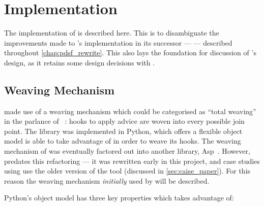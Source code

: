 \section{\pydysofu Implementation}\label{sec:prior_work_pdsf}

The implementation of \pydysofu{} is described here. This is to disambiguate the
improvements made to \pydysofu{}'s implementation in its successor ---
\pdsfthree --- described throughout \cref{chap:pdsf_rewrite}. This also lays the
foundation for discussion of \pdsfthree{}'s design, as it retains some design
decisions with \pydysofu.



\subsection{Weaving Mechanism}
\label{subsec:prior_work_weaving}

\pydysofu made use of a weaving mechanism which could be categorised as ``total
weaving'' in the parlance of
\citeauthor{dynamicAOchitchyan}~\cite{dynamicAOchitchyan}: hooks to apply advice
are woven into every possible join point. The library was implemented in Python,
which offers a flexible object model \pydysofu is able to take advantage of in
order to weave its hooks. The weaving mechanism of \pydysofu was eventually
factored out into another library, Asp~\cite{asp_repo}. However, \pydysofu{}
predates this refactoring --- it was rewritten early in this project, and case
studies using \pydysofu use the older version of the tool (discussed in
\cref{sec:caise_paper}). For this reason the weaving mechanism \emph{initially}
used by \pydysofu will be described. 

Python's object model has three key properties which \pydysofu takes advantage of:

\label{first_reference_to_magic_methods}

